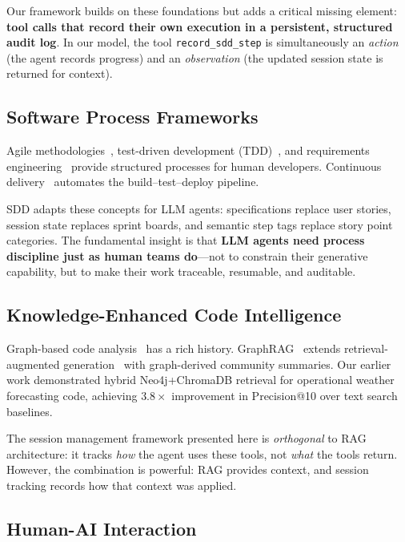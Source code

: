 \documentclass[11pt,letterpaper]{article}
\begin{document}
Our framework builds on these foundations but adds a critical missing
element: \textbf{tool calls that record their own execution in a
persistent, structured audit log}.  In our model, the tool
\texttt{record\_sdd\_step} is simultaneously an \emph{action} (the agent
records progress) and an \emph{observation} (the updated session state
is returned for context).

\subsection{Software Process Frameworks}

Agile methodologies~\cite{beck2001agile}, test-driven development
(TDD)~\cite{beck2003tdd}, and requirements engineering~\cite{sommerville2011requirements}
provide structured processes for human developers.
Continuous delivery~\cite{humble2010continuous} automates the build--test--deploy
pipeline.

SDD adapts these concepts for LLM agents: specifications replace user
stories, session state replaces sprint boards, and semantic step tags
replace story point categories.  The fundamental insight is that
\textbf{LLM agents need process discipline just as human teams do}---not
to constrain their generative capability, but to make their work
traceable, resumable, and auditable.

\subsection{Knowledge-Enhanced Code Intelligence}

Graph-based code analysis~\cite{allamanis2018survey} has a rich history.
GraphRAG~\cite{edge2024graphrag} extends retrieval-augmented
generation~\cite{lewis2020rag} with graph-derived community summaries.
Our earlier work demonstrated hybrid Neo4j+ChromaDB retrieval for
operational weather forecasting code, achieving $3.8\times$ improvement
in Precision@10 over text search baselines.

The session management framework presented here is \emph{orthogonal} to
RAG architecture: it tracks \emph{how} the agent uses these tools, not
\emph{what} the tools return.  However, the combination is powerful:
RAG provides context, and session tracking records how that context was
applied.

\subsection{Human-AI Interaction}
\end{document}
